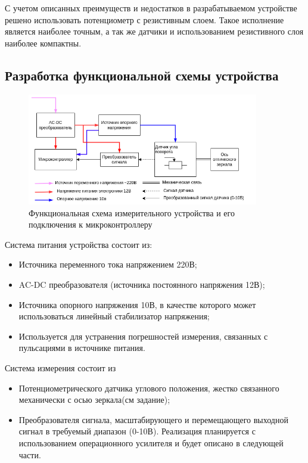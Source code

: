 С учетом описанных преимуществ и недостатков в разрабатываемом устройстве решено использовать потенциометр с резистивным слоем.
Такое исполнение является наиболее точным, а так же датчики и использованием резистивного слоя наиболее компактны.

\subsection{Разработка функциональной схемы устройства}

\begin{figure}[!h]
    \centering
    \includegraphics[width=0.9\textwidth]{img/ПИ.drawio}
    \caption{Функциональная схема измерительного устройства и его подключения к микроконтроллеру}
    \label{fig:drawio}
\end{figure}

Система питания устройства состоит из:
\begin{itemize}
    \item Источника переменного тока напряжением 220В;
    \item AC-DC преобразователя (источника постоянного напряжения 12В);
    \item Источника опорного напряжения 10В, в качестве которого может использоваться линейный стабилизатор напряжения;
    \item Используется для устранения погрешностей измерения, связанных с пульсациями в источнике питания.
\end{itemize}

Система измерения состоит из
\begin{itemize}
    \item Потенциометрического датчика углового положения, жестко связанного механически с осью зеркала(см задание);
    \item Преобразователя сигнала, масштабирующего и перемещающего выходной сигнал в требуемый диапазон (0-10В).
    Реализация планируется с использованием операционного усилителя и будет описано в следующей части.
\end{itemize}
\newpage
